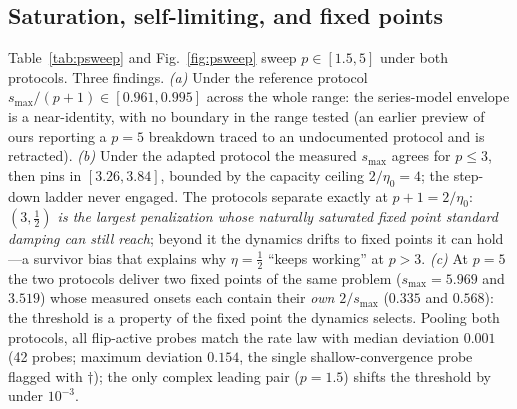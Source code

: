 \documentclass[11pt,a4paper]{article}
\newcommand{\smax}{s_{\max}}
\begin{document}
\subsection{Saturation, self-limiting, and fixed points}
\label{sec:saturation}

Table~\ref{tab:psweep} and Fig.~\ref{fig:psweep} sweep
$p\in[1.5,5]$ under both protocols. Three findings. \emph{(a)} Under
the reference protocol $\smax/(p{+}1)\in[0.961,0.995]$ across the whole
range: the series-model envelope is a near-identity, with no boundary in
the range tested (an earlier preview of ours reporting a $p=5$
breakdown traced to an undocumented protocol and is retracted).
\emph{(b)} Under the adapted protocol the measured $\smax$ agrees for
$p\le3$, then pins in $[3.26,3.84]$, bounded by the capacity ceiling
$2/\eta_0=4$; the step-down ladder never engaged. The protocols separate
exactly at $p{+}1=2/\eta_0$: \emph{$(3,\tfrac12)$ is the largest
penalization whose naturally saturated fixed point standard damping can
still reach}; beyond it the dynamics drifts to fixed points it can
hold---a survivor bias that explains why $\eta=\tfrac12$ ``keeps
working'' at $p>3$. \emph{(c)} At $p=5$ the two protocols deliver two
fixed points of the same problem ($\smax=5.969$ and $3.519$) whose
measured onsets each contain their \emph{own} $2/\smax$ ($0.335$ and
$0.568$): the threshold is a property of the fixed point the dynamics
selects. Pooling both protocols, all flip-active probes match the rate
law with median deviation $0.001$ (42 probes; maximum deviation
$0.154$, the single shallow-convergence probe flagged with $\dagger$);
the only complex leading pair ($p=1.5$) shifts the threshold by under
$10^{-3}$.
\end{document}
